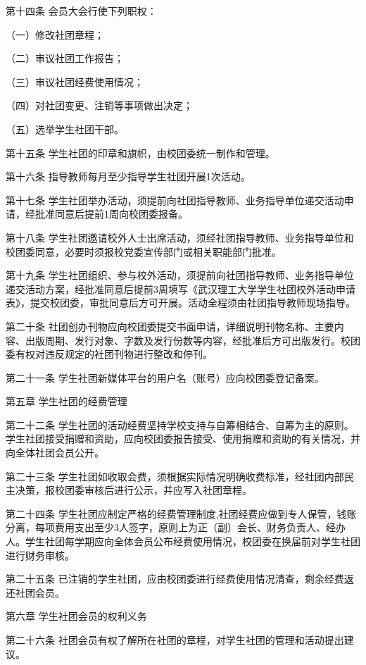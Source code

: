 \documentclass[UTF8,12pt,a4paper]{report}
\begin{document}
第十四条  会员大会行使下列职权：

（一）修改社团章程；

（二）审议社团工作报告；

（三）审议社团经费使用情况；

（四）对社团变更、注销等事项做出决定；

（五）选举学生社团干部。

第十五条  学生社团的印章和旗帜，由校团委统一制作和管理。

第十六条  指导教师每月至少指导学生社团开展1次活动。

第十七条  学生社团举办活动，须提前向社团指导教师、业务指导单位递交活动申请，经批准同意后提前1周向校团委报备。

第十八条  学生社团邀请校外人士出席活动，须经社团指导教师、业务指导单位和校团委同意，必要时须报校党委宣传部门或相关职能部门批准。

第十九条  学生社团组织、参与校外活动，须提前向社团指导教师、业务指导单位递交活动方案，经批准同意后提前3周填写《武汉理工大学学生社团校外活动申请表》，提交校团委，审批同意后方可开展。活动全程须由社团指导教师现场指导。

第二十条  社团创办刊物应向校团委提交书面申请，详细说明刊物名称、主要内容、出版周期、发行对象、字数及发行份数等内容，经批准后方可出版发行。校团委有权对违反规定的社团刊物进行整改和停刊。

第二十一条  学生社团新媒体平台的用户名（账号）应向校团委登记备案。



第五章  学生社团的经费管理

第二十二条  学生社团的活动经费坚持学校支持与自筹相结合、自筹为主的原则。学生社团接受捐赠和资助，应向校团委报告接受、使用捐赠和资助的有关情况，并向全体社团会员公开。

第二十三条  学生社团如收取会费，须根据实际情况明确收费标准，经社团内部民主决策，报校团委审核后进行公示，并应写入社团章程。

第二十四条  学生社团应制定严格的经费管理制度,社团经费应做到专人保管，钱账分离，每项费用支出至少3人签字，原则上为正（副）会长、财务负责人、经办人。学生社团每学期应向全体会员公布经费使用情况，校团委在换届前对学生社团进行财务审核。

第二十五条  已注销的学生社团，应由校团委进行经费使用情况清查，剩余经费返还社团会员。



第六章  学生社团会员的权利义务

第二十六条  社团会员有权了解所在社团的章程，对学生社团的管理和活动提出建议。
\end{document}
